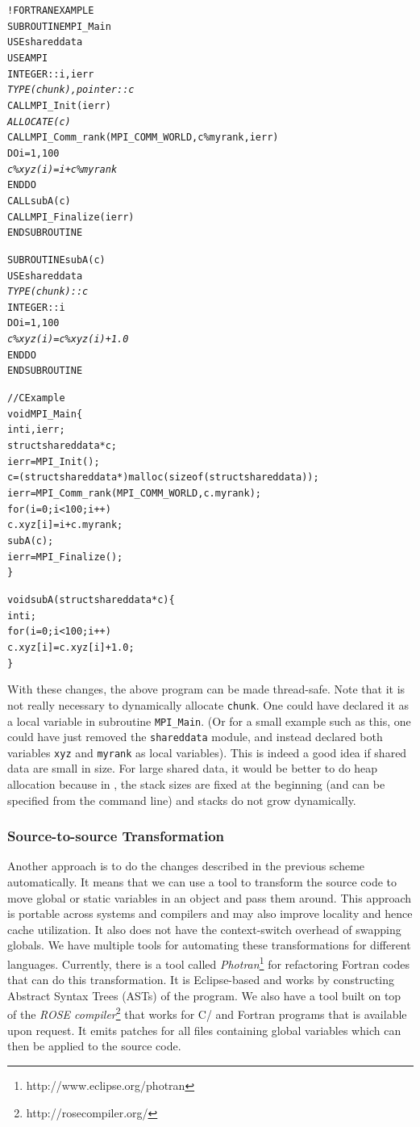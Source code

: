 \documentclass[10pt]{article}
\begin{document}
\begin{alltt}
!FORTRAN EXAMPLE
SUBROUTINE MPI_Main
  USE shareddata
  USE AMPI
  INTEGER :: i, ierr
  \emph{TYPE(chunk), pointer :: c}
  CALL MPI_Init(ierr)
  \emph{ALLOCATE(c)}
  CALL MPI_Comm_rank(MPI_COMM_WORLD, c\%myrank, ierr)
  DO i = 1, 100
    \emph{c\%xyz(i) =  i + c\%myrank}
  END DO
  CALL subA(c)
  CALL MPI_Finalize(ierr)
END SUBROUTINE

SUBROUTINE subA(c)
  USE shareddata
  \emph{TYPE(chunk) :: c}
  INTEGER :: i
  DO i = 1, 100
    \emph{c\%xyz(i) = c\%xyz(i) + 1.0}
  END DO
END SUBROUTINE

//C Example
void MPI_Main\{
  int i,ierr;
  struct shareddata *c;
  ierr = MPI_Init();
  c = (struct shareddata*)malloc(sizeof(struct shareddata));
  ierr = MPI_Comm_rank(MPI_COMM_WORLD, c.myrank);
  for(i=0;i<100;i++)
    c.xyz[i] = i + c.myrank;
  subA(c);
  ierr = MPI_Finalize();
\}

void subA(struct shareddata *c)\{
  int i;
  for(i=0;i<100;i++)
    c.xyz[i] = c.xyz[i] + 1.0;
\}
\end{alltt}

With these changes, the above program can be made thread-safe. Note that it is
not really necessary to dynamically allocate \texttt{chunk}. One could have
declared it as a local variable in subroutine \texttt{MPI\_Main}.  (Or for a
small example such as this, one could have just removed the \texttt{shareddata}
module, and instead declared both variables \texttt{xyz} and \texttt{myrank} as
local variables). This is indeed a good idea if shared data are small in size.
For large shared data, it would be better to do heap allocation because in
\ampi{}, the stack sizes are fixed at the beginning (and can be specified from the
command line) and stacks do not grow dynamically.

\subsubsection{Source-to-source Transformation}
Another approach is to do the changes described in the previous 
scheme automatically. It means that we can use a tool to transform 
the source code to move global or static variables in an object and pass them around.
This approach is portable across systems and compilers and may also 
improve locality and hence cache utilization. It also does not have the 
context-switch overhead of swapping globals. We have multiple tools for automating 
these transformations for different languages. Currently, there is a tool 
called \emph{Photran}\footnote{http://www.eclipse.org/photran}
for refactoring Fortran codes that can do this transformation. It is Eclipse-based
and works by constructing Abstract Syntax Trees (ASTs) of the program. We
also have a tool built on top of the \emph{ROSE compiler}\footnote{http://rosecompiler.org/}
that works for C/\CC{} and Fortran programs that is available upon request. It emits
patches for all files containing global variables which can then be applied to the source code.
\end{document}
